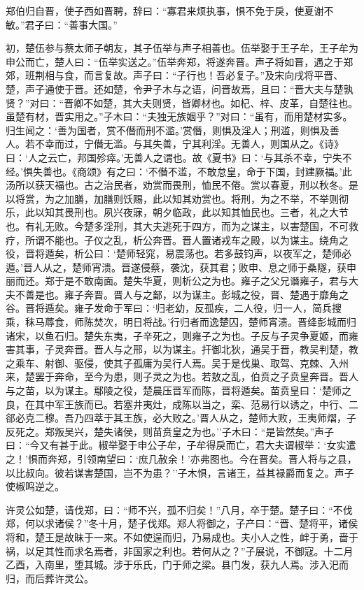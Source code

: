 \documentclass[]{article}
\begin{document}
郑伯归自晋，使子西如晋聘，辞曰：``寡君来烦执事，惧不免于戾，使夏谢不敏。''君子曰：``善事大国。''

初，楚伍参与蔡太师子朝友，其子伍举与声子相善也。伍举娶于王子牟，王子牟为申公而亡，楚人曰：``伍举实送之。''伍举奔郑，将遂奔晋。声子将如晋，遇之于郑郊，班荆相与食，而言复故。声子曰：``子行也！吾必复子。''及宋向戌将平晋、楚，声子通使于晋。还如楚，令尹子木与之语，问晋故焉，且曰：``晋大夫与楚孰贤？''对曰：``晋卿不如楚，其大夫则贤，皆卿材也。如杞、梓、皮革，自楚往也。虽楚有材，晋实用之。''子木曰：``夫独无族姻乎？''对曰：``虽有，而用楚材实多。归生闻之：`善为国者，赏不僭而刑不滥。'赏僭，则惧及淫人；刑滥，则惧及善人。若不幸而过，宁僭无滥。与其失善，宁其利淫。无善人，则国从之。《诗》曰：`人之云亡，邦国殄瘁。'无善人之谓也。故《夏书》曰：`与其杀不幸，宁失不经。'惧失善也。《商颂》有之曰：`不僭不滥，不敢怠皇，命于下国，封建厥福。'此汤所以获天福也。古之治民者，劝赏而畏刑，恤民不倦。赏以春夏，刑以秋冬。是以将赏，为之加膳，加膳则饫赐，此以知其劝赏也。将刑，为之不举，不举则彻乐，此以知其畏刑也。夙兴夜寐，朝夕临政，此以知其恤民也。三者，礼之大节也。有礼无败。今楚多淫刑，其大夫逃死于四方，而为之谋主，以害楚国，不可救疗，所谓不能也。子仪之乱，析公奔晋。晋人置诸戎车之殿，以为谋主。绕角之役，晋将遁矣，析公曰：`楚师轻窕，易震荡也。若多鼓钧声，以夜军之，楚师必遁。'晋人从之，楚师宵溃。晋遂侵蔡，袭沈，获其君；败申、息之师于桑隧，获申丽而还。郑于是不敢南面。楚失华夏，则析公之为也。雍子之父兄谮雍子，君与大夫不善是也。雍子奔晋。晋人与之鄐，以为谋主。彭城之役，晋、楚遇于靡角之谷。晋将遁矣。雍子发命于军曰：`归老幼，反孤疾，二人役，归一人，简兵搜乘，秣马蓐食，师陈焚次，明日将战。'行归者而逸楚囚，楚师宵溃。晋绛彭城而归诸宋，以鱼石归。楚失东夷，子辛死之，则雍子之为也。子反与子灵争夏姬，而雍害其事，子灵奔晋。晋人与之邢，以为谋主。扞御北狄，通吴于晋，教吴判楚，教之乘车、射御、驱侵，使其子孤庸为吴行人焉。吴于是伐巢、取驾、克棘、入州来，楚罢于奔命，至今为患，则子灵之为也。若敖之乱，伯贲之子贲皇奔晋。晋人与之苗，以为谋主。鄢陵之役，楚晨压晋军而陈，晋将遁矣。苗贲皇曰：`楚师之良，在其中军王族而已。若塞井夷灶，成陈以当之，栾、范易行以诱之，中行、二郤必克二穆。吾乃四萃于其王族，必大败之。'晋人从之，楚师大败，王夷师熠，子反死之。郑叛吴兴，楚失诸侯，则苗贲皇之为也。''子木曰：``是皆然矣。''声子曰：``今又有甚于此。椒举娶于申公子牟，子牟得戾而亡，君大夫谓椒举：`女实遣之！'惧而奔郑，引领南望曰：`庶几赦余！'亦弗图也。今在晋矣。晋人将与之县，以比叔向。彼若谋害楚国，岂不为患？''子木惧，言诸王，益其禄爵而复之。声子使椒鸣逆之。

许灵公如楚，请伐郑，曰：``师不兴，孤不归矣！''八月，卒于楚。楚子曰：``不伐郑，何以求诸侯？''冬十月，楚子伐郑。郑人将御之，子产曰：``晋、楚将平，诸侯将和，楚王是故昧于一来。不如使逞而归，乃易成也。夫小人之性，衅于勇，啬于祸，以足其性而求名焉者，非国家之利也。若何从之？''子展说，不御寇。十二月乙酉，入南里，堕其城。涉于乐氏，门于师之梁。县门发，获九人焉。涉入汜而归，而后葬许灵公。
\end{document}

